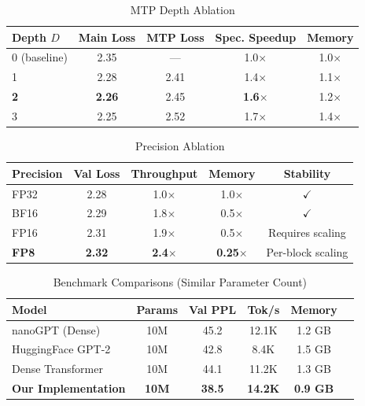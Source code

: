 \begin{table}[htbp]
\centering
\caption{MTP Depth Ablation}
\label{tab:mtp-ablation}
\begin{tabular}{@{}lcccc@{}}
\toprule
\textbf{Depth $D$} & \textbf{Main Loss} & \textbf{MTP Loss} & \textbf{Spec. Speedup} & \textbf{Memory} \\
\midrule
0 (baseline) & 2.35 & --- & 1.0$\times$ & 1.0$\times$ \\
1 & 2.28 & 2.41 & 1.4$\times$ & 1.1$\times$ \\
\textbf{2} & \textbf{2.26} & 2.45 & \textbf{1.6$\times$} & 1.2$\times$ \\
3 & 2.25 & 2.52 & 1.7$\times$ & 1.4$\times$ \\
\bottomrule
\end{tabular}
\end{table}

\begin{table}[htbp]
\centering
\caption{Precision Ablation}
\label{tab:precision-ablation}
\begin{tabular}{@{}lcccc@{}}
\toprule
\textbf{Precision} & \textbf{Val Loss} & \textbf{Throughput} & \textbf{Memory} & \textbf{Stability} \\
\midrule
FP32 & 2.28 & 1.0$\times$ & 1.0$\times$ & $\checkmark$ \\
BF16 & 2.29 & 1.8$\times$ & 0.5$\times$ & $\checkmark$ \\
FP16 & 2.31 & 1.9$\times$ & 0.5$\times$ & Requires scaling \\
\textbf{FP8} & \textbf{2.32} & \textbf{2.4$\times$} & \textbf{0.25$\times$} & Per-block scaling \\
\bottomrule
\end{tabular}
\end{table}


\begin{table}[htbp]
\centering
\caption{Benchmark Comparisons (Similar Parameter Count)}
\label{tab:benchmark-comparison}
\begin{tabular}{@{}lccccc@{}}
\toprule
\textbf{Model} & \textbf{Params} & \textbf{Val PPL} & \textbf{Tok/s} & \textbf{Memory} \\
\midrule
nanoGPT (Dense) & 10M & 45.2 & 12.1K & 1.2 GB \\
HuggingFace GPT-2 & 10M & 42.8 & 8.4K & 1.5 GB \\
Dense Transformer & 10M & 44.1 & 11.2K & 1.3 GB \\
\textbf{Our Implementation} & \textbf{10M} & \textbf{38.5} & \textbf{14.2K} & \textbf{0.9 GB} \\
\bottomrule
\end{tabular}
\end{table}

